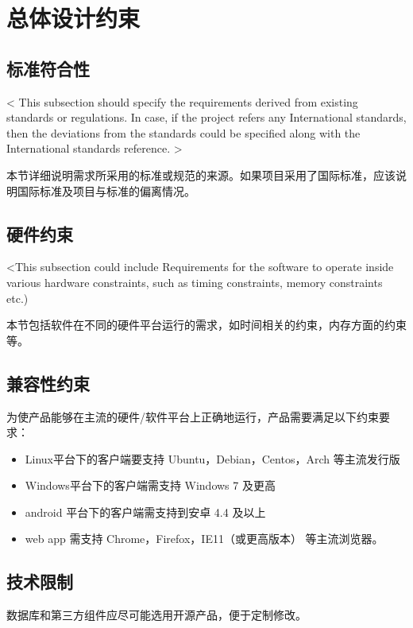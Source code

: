 \chapter{总体设计约束}

 
\section{标准符合性}
< This subsection should specify the requirements derived from existing standards or regulations. In case, if the project refers any International standards, then the deviations from the standards could be specified along with the International standards reference. >

本节详细说明需求所采用的标准或规范的来源。如果项目采用了国际标准，应该说明国际标准及项目与标准的偏离情况。

\section{硬件约束}
<This subsection could include Requirements for the software to operate inside various hardware constraints, such as timing constraints, memory constraints etc.)

本节包括软件在不同的硬件平台运行的需求，如时间相关的约束，内存方面的约束等。

\section{兼容性约束}
为使产品能够在主流的硬件/软件平台上正确地运行，产品需要满足以下约束要求：
\begin{itemize}
    \item Linux平台下的客户端要支持 Ubuntu，Debian，Centos，Arch 等主流发行版
    \item Windows平台下的客户端需支持 Windows 7 及更高
    \item android 平台下的客户端需支持到安卓 4.4 及以上
    \item web app 需支持 Chrome，Firefox，IE11（或更高版本） 等主流浏览器。
    \end{itemize}

\section{技术限制}


数据库和第三方组件应尽可能选用开源产品，便于定制修改。
